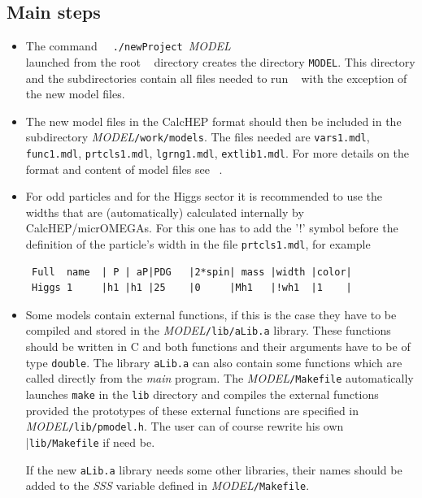 \documentclass[12pt,a4paper]{article}
\begin{document}
\subsection{ Main steps}
\begin{itemize}
\item
The command
\verb|  ./newProject |{\it MODEL}\\
launched from the root \micro~ directory  creates the directory 
\verb|MODEL|. This directory and the subdirectories contain all files needed to run \micro~ with the
exception of the new model files. 
\item
The new model files in the CalcHEP format should then be included in the
 subdirectory {\it MODEL}\verb|/work/models|.  The files needed are
\verb|vars1.mdl|,  \verb|func1.mdl|,  \verb|prtcls1.mdl|, \verb|lgrng1.mdl|,
\verb|extlib1.mdl|. For more details on the format and content of model files see
~\cite{Pukhov:2004ca}.

\item
For odd particles and for the Higgs sector it is recommended to use the widths that are (automatically) calculated internally by 
CalcHEP/micrOMEGAs. 
For this  one has to add the '!' symbol before  
the definition of the particle's width  in  the file \verb|prtcls1.mdl|, for example
\begin{verbatim}
 Full  name  | P | aP|PDG   |2*spin| mass |width |color|  
 Higgs 1     |h1 |h1 |25    |0     |Mh1   |!wh1  |1    |
\end{verbatim}


\item
Some models contain  external functions, if this is the case  they have to be 
compiled and stored in the {\it MODEL}\verb|/lib/aLib.a| library. 
These functions should be written in C and both functions and their arguments have to be 
of type \verb|double|. The library \verb|aLib.a| 
can also contain some functions which are called directly from the 
{\it main} program. The {\it MODEL}\verb|/Makefile| automatically launches
\verb|make| in the \verb|lib| directory and compiles the external functions provided
the prototypes of these external 
functions are specified in  {\it MODEL}\verb|/lib/pmodel.h|. 
The user can of course rewrite 
his own  |\verb|lib/Makefile| if need be.

If the new \verb|aLib.a| library needs some other libraries, their
names should be added to the {\it SSS} variable defined in {\it MODEL}\verb|/Makefile|.
\end{itemize}
\end{document}
